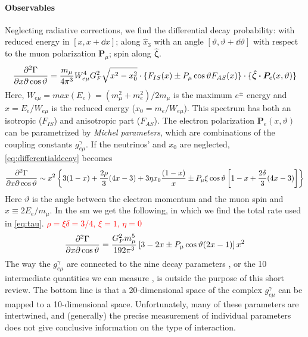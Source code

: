 \begin{refsection}
        \paragraph{Observables} 
        Neglecting radiative corrections, we find the differential decay probability: with reduced energy in $[x,x+\dd x]$; along $\hat{x}_3$ with an angle $[\vartheta,\vartheta+\dd\vartheta]$ with respect to the muon polarization $\pmb{P}_\mu$; spin along $\bm{\hat{\zeta}}$.
        \begin{equation}
            \pdv[2]{\Gamma}{x}{\cos\vartheta}=\frac{m_\mu}{4\pi^3}W^4_{e\mu}G^2_F\sqrt{x^2-x_0^2}\cdot \{F_{IS}(x)\pm P_\mu\cos\vartheta F_{AS}(x)\}\cdot\{\bm{\hat{\zeta}\cdot P}_e(x,\vartheta)\}
            \label{eq:differentialdecay}
        \end{equation}
        Here, $W_{e\mu}=max(E_e)=(m_\mu^2+m_e^2)/2m_\mu$ is the maximum $e^\pm$ energy and $x=E_e/W_{e\mu}$ is the reduced energy ($x_0=m_e/W_{e\mu}$).
        This spectrum has both an isotropic ($F_{IS}$) and anisotropic part ($F_{AS}$). 
        The electron polarization $\bm{P}_e(x,\vartheta)$ can be parametrized by \textit{Michel parameters}, which are combinations of the coupling constants $g^\gamma_{e\mu}$.
        If the neutrinos'  and $x_0$ are neglected, \ref{eq:differentialdecay} becomes
        \begin{equation}
            \pdv[2]{\Gamma}{x}{\cos\vartheta}\sim x^2\left\{ 3(1-x)+\frac{2\rho}{3}(4x-3)+3\eta x_0\frac{(1-x)}{x} \pm P_\mu\xi\cos\vartheta  \left[1-x+\frac{2\delta}{3}(4x-3) \right]\right\}
        \end{equation}
        Here $\vartheta$ is the angle between the electron momentum and the muon spin and $x\equiv2E_e/m_\mu$. 
        In the \gls{sm} we get the following, in which we find the total rate used in \ref{eq:tau}. \textcolor{red}{$\rho=\xi\delta=3/4$, $\xi=1$, $\eta=0$}
        \begin{equation}
            \pdv[2]{\Gamma}{x}{\cos\vartheta}=\frac{G_F^2 m_\mu^5}{192 \pi^3} \left[ 3-2x \pm P_\mu\cos\vartheta (2x-1) \right]x^2
        \end{equation}
        The way the $g^\gamma_{e\mu}$ are connected to the nine decay parameters \cite{3,10}, or the 10 intermediate quantities we can measure \cite{3}, is outside the purpose of this short review. 
        The bottom line is that a 20-dimensional space of the complex $g^\gamma_{e\mu}$ can be mapped to a 10-dimensional space.
        Unfortunately, many of these parameters are intertwined, and (generally) the precise measurement of individual parameters does not give conclusive information on the type of interaction.

\end{refsection}
